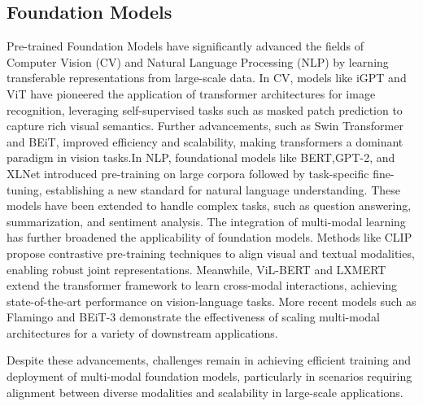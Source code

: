 \subsection{Foundation Models}
Pre-trained Foundation Models have significantly advanced the fields of Computer Vision (CV) and Natural Language Processing (NLP) by learning transferable representations from large-scale data. 
In CV, models like iGPT\cite{chen2020generative} and ViT\cite{dosovitskiy2020Image} have pioneered the application of transformer architectures for image recognition, leveraging self-supervised tasks such as masked patch prediction to capture rich visual semantics.
Further advancements, such as Swin Transformer\cite{liu2021Swin} and BEiT\cite{bao2021beit}, improved efficiency and scalability, making transformers a dominant paradigm in vision tasks.In NLP, foundational models like BERT\cite{devlin2019BERT},GPT-2\cite{radford2019language}, and XLNet\cite{yang2019xlnet} introduced pre-training on large corpora followed by task-specific fine-tuning, establishing a new standard for natural language understanding. These models have been extended to handle complex tasks, such as question answering, summarization, and sentiment analysis.
The integration of multi-modal learning has further broadened the applicability of foundation models. Methods like CLIP\cite{radford2021learning} propose contrastive pre-training techniques to align visual and textual modalities, enabling robust joint representations. 
Meanwhile, ViL-BERT\cite{lu2019vilbert} and LXMERT\cite{tan2019lxmert} extend the transformer framework to learn cross-modal interactions, achieving state-of-the-art performance on vision-language tasks. More recent models such as Flamingo\cite{alayrac2022flamingo} and BEiT-3\cite{wang2022image} demonstrate the effectiveness of scaling multi-modal architectures for a variety of downstream applications.

Despite these advancements, challenges remain in achieving efficient training and deployment of multi-modal foundation models, particularly in scenarios requiring alignment between diverse modalities and scalability in large-scale applications.